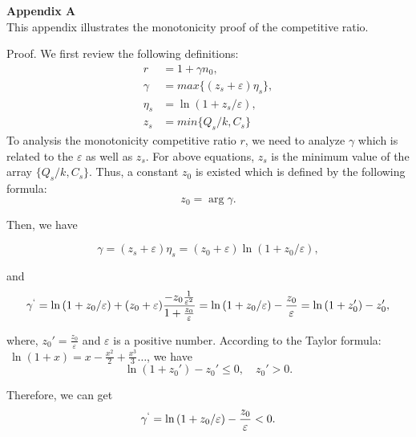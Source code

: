 \documentclass[journal,article,submit,pdftex,moreauthors]{Definitions/mdpi}
\begin{document}

\textbf{Appendix A}\\
This appendix illustrates  the monotonicity proof of the competitive ratio.

Proof. We first review the following definitions:\\

\begin{align*}
r&=1+\gamma n_0,\\
\gamma&=max\{\left(z_s+\varepsilon\right)\eta_s\},\\
\eta_s&=\ln{\left(1+z_s/\varepsilon\right)},\\
z_s&=min\{Q_s/k,C_s\}
\end{align*}
To analysis the monotonicity competitive ratio $r$, we need to analyze  $\gamma$  which is related to the $\varepsilon$ as well as $z_s$. For above equations, $z_s$ is the minimum value of the array $\{Q_s/k,C_s\}$. Thus, a constant $z_0$ is existed which  is defined by the following formula:\\



\begin{equation*}
z_0= \mathop{\arg \max_{z_s}} \gamma \nonumber.
\end{equation*}


 Then, we have

\begin{equation*}
\gamma=\left(z_s+\varepsilon\right)\eta_s=\left(z_0+\varepsilon\right)\ln{\left(1+z_0/\varepsilon\right)},
\end{equation*}

and
\begin{equation*}
\gamma^{`}=\ln{\left(1+z_0/\varepsilon\right)}+\left(z_0+\varepsilon\right)\frac{-z_0\frac{1}{\varepsilon^2}}{1+\frac{z_0}{\varepsilon}}=\ln{\left(1+z_0/\varepsilon \right)}-\frac{z_0}{\varepsilon}=\ln{\left(1+z_0'\right)}-z_0',
\end{equation*}

where, $z_0'=\frac{z_0}{\varepsilon}$  and $\varepsilon$ is a positive number. According to the Taylor formula: $\ \ln{\left(1+x\right)}=x-\frac{x^2}{2}+\frac{x^3}{3}\ldots$, we have\\

\begin{equation*}
\ln{\left(1+z_0'\right)}-z_0'\le0,\quad z_0'>0.
\end{equation*}

Therefore, we can get
\begin{equation*}
\gamma^`=\ln{\left(1+z_0/\varepsilon\right)}-\frac{z_0}{\varepsilon}<0.
\end{equation*}
\end{document}

